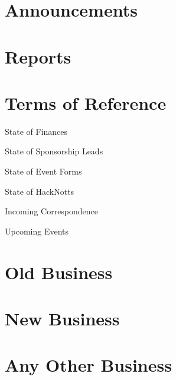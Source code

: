 \documentclass[11pt,hacksoc]{meetingmins}
\begin{document}
\maketitle

\section{Announcements}
\begin{items}
\item
\end{items}

\section{Reports}


\section{Terms of Reference}
\begin{items}
\item {State of Finances}
\item {State of Sponsorship Leads}
\item {State of Event Forms}
\item {State of HackNotts}
\item {Incoming Correspondence}
\item {Upcoming Events}
\end{items}

\section{Old Business}
\begin{items}
\item
\end{items}

\section{New Business}
\begin{items}
\item
\end{items}

\section{Any Other Business}

\vspace{1em}
\nextmeeting{}
\end{document}
